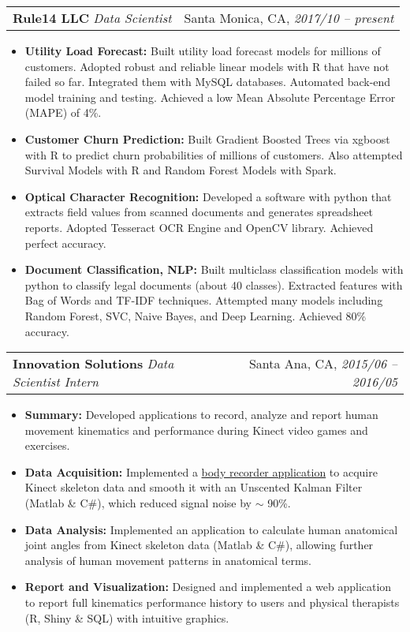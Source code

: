 \documentclass[hidelinks,letterpaper,11pt]{article}
\makeatletter
\newcommand{\resumeItem}[2]{
  \item{
    \textbf{#1: }{\small #2 \vspace{-2pt}}
  }
}
\newcommand{\resumeSubheading}[4]{
  \vspace{-1pt}
  \item
    \begin{tabular*}{0.97\textwidth}{l@{\extracolsep{\fill}}r}
      \textbf{#1} \textit{\small #3} & {#2} \textit{\small #4} 
    \end{tabular*}
  \vspace{-5pt}
}
\newcommand{\resumeItemListStart}{\begin{itemize}}
\newcommand{\resumeItemListEnd}{\end{itemize}\vspace{-5pt}}
\makeatother
\begin{document}
    \resumeSubheading
      {Rule14 LLC}{Santa Monica, CA,}
      {Data Scientist}{2017/10 -- present}
      \resumeItemListStart
        \resumeItem{Utility Load Forecast}
          {Built utility load forecast models for millions of customers. 
            Adopted robust and reliable linear models with R that have not failed so far.
            Integrated them with MySQL databases.
            Automated back-end model training and testing.
            Achieved a low Mean Absolute Percentage Error (MAPE) of 4\%.}
        \resumeItem{Customer Churn Prediction}
          {Built Gradient Boosted Trees via \textsf{xgboost} with R to 
            predict churn probabilities of millions of customers.
            Also attempted Survival Models with R and Random Forest Models with Spark.}
        \resumeItem{Optical Character Recognition}
          {Developed a software with python that extracts field values 
            from scanned documents and generates spreadsheet reports. 
            Adopted Tesseract OCR Engine and OpenCV library.
            Achieved perfect accuracy.}
        \resumeItem{Document Classification, NLP}
          {Built multiclass classification models with python to 
            classify legal documents (about 40 classes).
            Extracted features with Bag of Words and TF-IDF techniques.
            Attempted many models including Random Forest, SVC, Naive Bayes, and Deep Learning.
            Achieved 80\% accuracy.}
      \resumeItemListEnd

  
    \resumeSubheading
      {Innovation Solutions}{Santa Ana, CA,}
      {Data Scientist Intern}{2015/06 -- 2016/05}
      \resumeItemListStart
        \resumeItem{Summary}
          {Developed applications to {record}, analyze and 
            report human movement kinematics and performance 
            during {Kinect} video games and exercises.}
        \resumeItem{Data Acquisition}
          {Implemented a 
            \href{https://github.com/chunjiw/kinect-2-body-recorder}
            {\textsf{body recorder application}} to acquire Kinect skeleton data and 
            smooth it with an Unscented {Kalman Filter} (Matlab \& C\#), 
            which reduced signal noise by $\sim$ 90\%.}
        \resumeItem{Data Analysis}
          {Implemented an application to calculate human anatomical joint angles 
            from Kinect skeleton data (Matlab \& C\#), 
            allowing further analysis of human movement patterns in anatomical terms.}
        \resumeItem{Report and Visualization}
          {Designed and implemented a web application to report 
            full kinematics performance history to users and 
            physical therapists ({R, Shiny \& SQL}) with intuitive graphics.}
      \resumeItemListEnd
    
\end{document}
